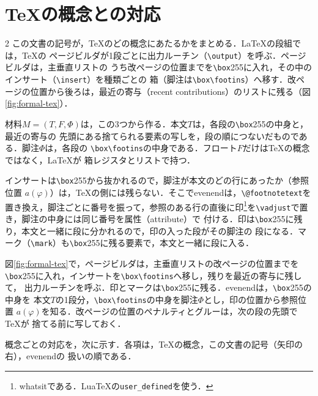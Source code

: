 \documentclass[paper=a4,fontsize=10pt]{jlreq}
\providecommand\LuaTeX{Lua\TeX}
\newcommand\cs[1]{\texttt{\textbackslash #1}}
\begin{document}
\section{\TeX{}の概念との対応}\label{sec:formal-tex}

\begin{multicols}{2}
この文書の記号が，\TeX{}のどの概念にあたるかをまとめる．\LaTeX{}の段組では，\TeX{}の
ページビルダが1段ごとに出力ルーチン（\cs{output}）を呼ぶ．ページビルダは，主垂直リストの
うち改ページの位置までを\cs{box}255に入れ，その中のインサート（\cs{insert}）を種類ごとの
箱（脚注は\cs{box}\cs{footins}）へ移す．改ページの位置から後ろは，最近の寄与（recent
contributions）のリストに残る（図\ref{fig:formal-tex}）．

材料$M=(T,F,\Phi)$は，この3つから作る．本文$T$は，各段の\cs{box}255の中身と，最近の寄与の
先頭にある捨てられる要素の写しを，段の順につないだものである．脚注$\Phi$は，各段の
\cs{box}\cs{footins}の中身である．フロート$F$だけは\TeX{}の概念ではなく，\LaTeX{}が
箱レジスタとリストで持つ．

インサートは\cs{box}255から抜かれるので，脚注が本文のどの行にあったか（参照位置
$a(\varphi)$）は，\TeX{}の側には残らない．そこでevenendは，\cs{@footnotetext}を
置き換え，脚注ごとに番号を振って，参照のある行の直後に印\footnote{whatsitである．\LuaTeX{}の\texttt{user\_defined}を使う．}を\cs{vadjust}で置き，脚注の中身には同じ番号を属性（attribute）で
付ける．印は\cs{box}255に残り，本文と一緒に段に分かれるので，印の入った段がその脚注の
段になる．マーク（\cs{mark}）も\cs{box}255に残る要素で，本文と一緒に段に入る．
\end{multicols}

図\ref{fig:formal-tex}で，ページビルダは，主垂直リストの改ページの位置までを
\cs{box}255に入れ，インサートを\cs{box}\cs{footins}へ移し，残りを最近の寄与に残して，
出力ルーチンを呼ぶ．印とマークは\cs{box}255に残る．evenendは，\cs{box}255の中身を
本文$T$の1段分，\cs{box}\cs{footins}の中身を脚注$\Phi$とし，印の位置から参照位置
$a(\varphi)$を知る．改ページの位置のペナルティとグルーは，次の段の先頭で\TeX{}が
捨てる前に写しておく．


概念ごとの対応を，次に示す．各項は，\TeX{}の概念，この文書の記号（矢印の右），evenendの
扱いの順である．
\end{document}
